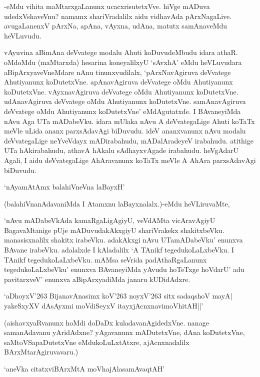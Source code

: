-eMdu vihita maMtarxgaLanunx ucacxrisutetxVve. hiVge mADuva udedxVshaveVnu? namamx shariVradalilx aidu vidhavAda pArxNagaLive. avugaLanenxV pArxNa, apAna, vAyxna, udAna, matutx samAnaveMdu heVLuvudu.

vAyuvina aBimAna deVvatege modalu Ahuti koDuvudeMbudu idara athaR. oMdoMdu (maMtarxda) hesarina koneyalilxyU `sAvxhA' eMdu heVLuvudara aBipArxyaveVneMdare nAnu tinunxvudilalx, `pArxNavAgiruva deVvatege Ahutiyanunx koDutetxVne. apAnavAgiruva deVvatege oMdu Ahutiyanunx koDutetxVne. vAyxnavAgiruva deVvatege oMdu Ahutiyanunx koDutetxVne. udAnavAgiruva deVvatege oMdu Ahutiyanunx koDutetxVne. samAnavAgiruva deVvatege oMdu Ahutiyanunx koDutetxVne' eMdAgutatxde. I BAvaneyiMda nAvu Aga UTa mADabeVku. idara mUlaka nAvu A deVvategaLige Ahuti koTaTx meVle uLida ananx parxsAdavAgi biDuvudu. ideV ananxvanunx nAvu modalu deVvategaLige neYveVdayx mADirabahudu, mADalAradeyeV irabahudu. atithige UTa hAkirabahudu, athavA hAkalu sAdhayxvAgade irabahudu. heVgAdarU Agali, I aidu deVvategaLige AhAravanunx koTaTx meVle A AhAra parxsAdavAgi biDuvudu.

\begin{shloka}
`nAyamAtAmx balahiVneVna laBayxH'
\end{shloka}

(balahiVnanAdavaniMda I Atamxnu laBayxnalalx.)-eMdu heVLiruvaMte,

`nAvu mADabeVkAda kamaRgaLigAgiyU, veVdAMta vicAravAgiyU BagavaMtanige pUje mADuvudakAkxgiyU shariVrakekx shakitxbeVku. manasisxnalilx shakitx irabeVku. adakAkxgi nAvu UTamADabeVku' enunxva BAvane irabeVku. adalalxde I kAladalilx `A TAnikf tegedukoLaLxbeVku. I TAnikf tegedukoLaLxbeVku. mAMsa seVrida padAthaRgaLanunx tegedukoLaLxbeVku' enunxva BAvaneyiMda yAvudu hoTeTxge hoVdarU' adu pavitarxveV' enunxva aBipArxyadiMda janaru kUDidAdxre.

\begin{shloka}
`aDhoyxV\char'263 BijanavAnasimx koV\char'263 noyxV\char'263 sitx sadaqshoV mayA|\\
yakeSxyXV dAsAyxmi moVdiSeyxV itayxjAcnxnavimoVhitAH||'
\end{shloka}

(aishavxyaRvanunx hoMdi doDaDx kuladavanAgidedxVne. nanage samanAdavanu yAridAdxne? yAgavanunx mADutetxVne, dAna koDutetxVne, saMtoVSapaDutetxVne eMdukoLuLxtAtxre, ajAcnxnadalilx BArxMtarAgiruvavaru.)

\begin{shloka}
`aneVka citatxviBArxMtA moVhajAlasamAvaqtAH'
\end{shloka}

